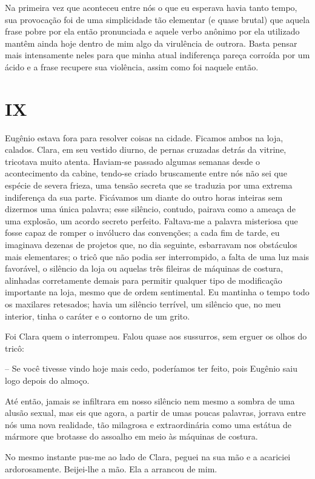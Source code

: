 Na primeira vez que aconteceu entre nós o que eu esperava havia tanto tempo, sua provocação foi de uma simplicidade tão elementar (e quase brutal) que aquela frase pobre por ela então pronunciada e aquele verbo anônimo por ela utilizado mantêm ainda hoje dentro de mim algo da virulência de outrora. Basta pensar mais intensamente neles para que minha atual indiferença pareça corroída por um ácido e a frase recupere sua violência, assim como foi naquele então.


\chapter*{\centering\Large{IX}}

Eugênio estava fora para resolver coisas na cidade. Ficamos ambos na loja, calados. Clara, em seu vestido diurno, de pernas cruzadas detrás da vitrine, tricotava muito atenta. Haviam-se passado algumas semanas desde o acontecimento da cabine, tendo-se criado bruscamente entre nós não sei que espécie de severa frieza, uma tensão secreta que se traduzia por uma extrema indiferença da sua parte. Ficávamos um diante do outro horas inteiras sem dizermos uma única palavra; esse silêncio, contudo, pairava como a ameaça de uma explosão, um acordo secreto perfeito. Faltava-me a palavra misteriosa que fosse capaz de romper o invólucro das convenções; a cada fim de tarde, eu imaginava dezenas de projetos que, no dia seguinte, esbarravam nos obstáculos mais elementares; o tricô que não podia ser interrompido, a falta de uma luz mais favorável, o silêncio da loja ou aquelas três fileiras de máquinas de costura, alinhadas corretamente demais para permitir qualquer tipo de modificação importante na loja, mesmo que de ordem sentimental. Eu mantinha o tempo todo os maxilares retesados; havia um silêncio terrível, um silêncio que, no meu interior, tinha o caráter e o contorno de um grito.

Foi Clara quem o interrompeu. Falou quase aos sussurros, sem erguer os olhos do tricô:

-- Se você tivesse vindo hoje mais cedo, poderíamos ter feito, pois Eugênio saiu logo depois do almoço.

Até então, jamais se infiltrara em nosso silêncio nem mesmo a sombra de uma alusão sexual, mas eis que agora, a partir de umas poucas palavras, jorrava entre nós uma nova realidade, tão milagrosa e extraordinária como uma estátua de mármore que brotasse do assoalho em meio às máquinas de costura.

No mesmo instante pus-me ao lado de Clara, peguei na sua mão e a acariciei ardorosamente. Beijei-lhe a mão. Ela a arrancou de mim.

